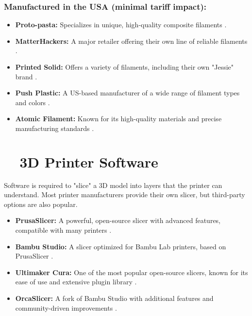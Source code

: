 \subsubsection{Manufactured in the USA (minimal tariff impact):}
\begin{itemize}
	\item \textbf{Proto-pasta:} Specializes in unique, high-quality composite filaments \supercite{ProtoPasta}.
	\item \textbf{MatterHackers:} A major retailer offering their own line of reliable filaments \supercite{MatterHackers}.
	\item \textbf{Printed Solid:} Offers a variety of filaments, including their own "Jessie" brand \supercite{PrintedSolid}.
	\item \textbf{Push Plastic:} A US-based manufacturer of a wide range of filament types and colors \supercite{PushPlastic}.
	\item \textbf{Atomic Filament:} Known for its high-quality materials and precise manufacturing standards \supercite{AtomicFilament}.
\end{itemize}

\section{~~3D Printer Software}\label{ch5:sec:software}
Software is required to "slice" a 3D model into layers that the printer can understand. Most printer manufacturers provide their own slicer, but third-party options are also popular.
\begin{itemize}
	\item \textbf{PrusaSlicer:} A powerful, open-source slicer with advanced features, compatible with many printers \supercite{PrusaSlicer}.
	\item \textbf{Bambu Studio:} A slicer optimized for Bambu Lab printers, based on PrusaSlicer \supercite{BambuStudio}.
	\item \textbf{Ultimaker Cura:} One of the most popular open-source slicers, known for its ease of use and extensive plugin library \supercite{Cura}.
	\item \textbf{OrcaSlicer:} A fork of Bambu Studio with additional features and community-driven improvements \supercite{OrcaSlicer}.
\end{itemize}

